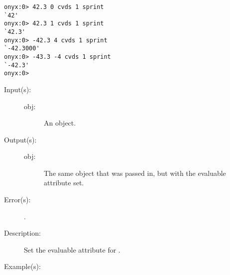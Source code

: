 \begin{description}
\begin{description}
\begin{verbatim}
onyx:0> 42.3 0 cvds 1 sprint
`42'
onyx:0> 42.3 1 cvds 1 sprint
`42.3'
onyx:0> -42.3 4 cvds 1 sprint
`-42.3000'
onyx:0> -43.3 -4 cvds 1 sprint
`-42.3'
onyx:0>
		\end{verbatim}
	\end{description}
\label{systemdict:cve}
\item[{\onyxop{obj}{cve}{obj}}: ]
	\begin{description}\item[]
	\item[Input(s): ]
		\begin{description}\item[]
		\item[obj: ]
			An object.
		\end{description}
	\item[Output(s): ]
		\begin{description}\item[]
		\item[obj: ]
			The same object that was passed in, but with the
			evaluable attribute set.
		\end{description}
	\item[Error(s): ]
		\begin{description}\item[]
		\item[.]
		\end{description}
	\item[Description: ]
		Set the evaluable attribute for .
	\item[Example(s): ]\begin{verbatim}


\end{verbatim}
\end{description}
\end{description}
